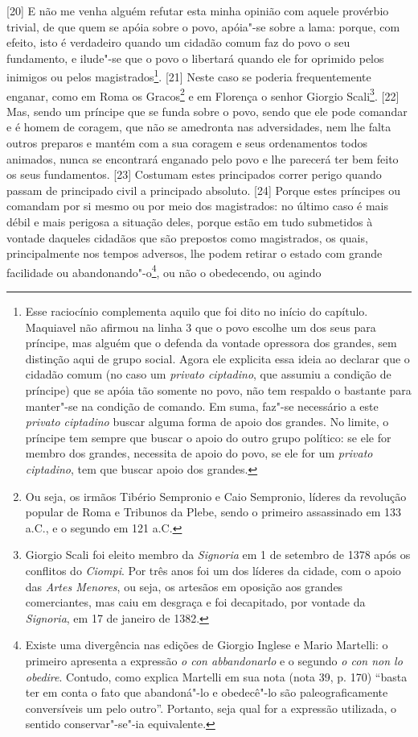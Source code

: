 {[}20{]} E não me venha alguém refutar esta minha opinião com aquele
provérbio trivial, de que quem se apóia sobre o povo, apóia"-se sobre a
lama: porque, com efeito, isto é verdadeiro quando um cidadão comum faz
do povo o seu fundamento, e ilude"-se que o povo o libertará quando ele
for oprimido pelos inimigos ou pelos magistrados\footnote{Esse
  raciocínio complementa aquilo que foi dito no início do capítulo.
  Maquiavel não afirmou na linha 3 que o povo escolhe um dos seus para
  príncipe, mas alguém que o defenda da vontade opressora dos grandes,
  sem distinção aqui de grupo social. Agora ele explicita essa ideia ao
  declarar que o cidadão comum (no caso um \emph{privato ciptadino}, que
  assumiu a condição de príncipe) que se apóia tão somente no povo, não
  tem respaldo o bastante para manter"-se na condição de comando. Em
  suma, faz"-se necessário a este \emph{privato ciptadino} buscar alguma
  forma de apoio dos grandes. No limite, o príncipe tem sempre que
  buscar o apoio do outro grupo político: se ele for membro dos grandes,
  necessita de apoio do povo, se ele for um \emph{privato ciptadino},
  tem que buscar apoio dos grandes.}. {[}21{]} Neste caso se poderia
frequentemente enganar, como em Roma os Gracos\footnote{Ou seja, os
  irmãos Tibério Sempronio e Caio Sempronio, líderes da revolução
  popular de Roma e Tribunos da Plebe, sendo o primeiro assassinado em
  133 a.C., e o segundo em 121 a.C.} e em Florença o senhor Giorgio
Scali\footnote{Giorgio Scali foi eleito membro da \emph{Signoria} em 1
  de setembro de 1378 após os conflitos do \emph{Ciompi}. Por três anos
  foi um dos líderes da cidade, com o apoio das \emph{Artes Menores}, ou
  seja, os artesãos em oposição aos grandes comerciantes, mas caiu em
  desgraça e foi decapitado, por vontade da \emph{Signoria}, em 17 de
  janeiro de 1382.}. {[}22{]} Mas, sendo um príncipe que se funda sobre
o povo, sendo que ele pode comandar e é homem de coragem, que não se
amedronta nas adversidades, nem lhe falta outros preparos e mantém com a
sua coragem e seus ordenamentos todos animados, nunca se encontrará
enganado pelo povo e lhe parecerá ter bem feito os seus fundamentos.
{[}23{]} Costumam estes principados correr perigo quando passam de
principado civil a principado absoluto. {[}24{]} Porque estes príncipes
ou comandam por si mesmo ou por meio dos magistrados: no último caso é
mais débil e mais perigosa a situação deles, porque estão em tudo
submetidos à vontade daqueles cidadãos que são prepostos como
magistrados, os quais, principalmente nos tempos adversos, lhe podem
retirar o estado com grande facilidade ou abandonando"-o\footnote{Existe
  uma divergência nas edições de Giorgio Inglese e Mario Martelli: o
  primeiro apresenta a expressão \emph{o con abbandonarlo} e o segundo
  \emph{o con non lo obedire}. Contudo, como explica Martelli em sua
  nota (nota 39, p. 170) ``basta ter em conta o fato que abandoná"-lo e
  obedecê"-lo são paleograficamente conversíveis um pelo outro''.
  Portanto, seja qual for a expressão utilizada, o sentido
  conservar"-se"-ia equivalente.}, ou não o obedecendo, ou agindo
